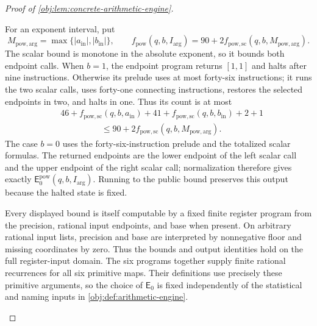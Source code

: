 \begin{proof}[Proof of \cref{obj:lem:concrete-arithmetic-engine}]
\begin{enumerate}
For an exponent interval, put
\[
M_{\mathrm{pow},\mathrm{arg}}
 =\max\{|a_{\mathrm{in}}|,|b_{\mathrm{in}}|\},
\qquad
f_{\mathrm{pow}}(q,b,I_{\mathrm{arg}})
 =90+2f_{\mathrm{pow},\mathrm{sc}}
       (q,b,M_{\mathrm{pow},\mathrm{arg}}).
\]
The scalar bound is monotone in the absolute exponent, so it bounds both endpoint calls. When \(b=1\), the endpoint program returns \([1,1]\) and halts after nine instructions. Otherwise its prelude uses at most forty-six instructions; it runs the two scalar calls, uses forty-one connecting instructions, restores the selected endpoints in two, and halts in one. Thus its count is at most
\[
\begin{split}
&46+f_{\mathrm{pow},\mathrm{sc}}(q,b,a_{\mathrm{in}})
 +41+f_{\mathrm{pow},\mathrm{sc}}(q,b,b_{\mathrm{in}})+2+1\\
&\hspace{2cm}\le
90+2f_{\mathrm{pow},\mathrm{sc}}
       (q,b,M_{\mathrm{pow},\mathrm{arg}}).
\end{split}
\]
The case \(b=0\) uses the forty-six-instruction prelude and the totalized scalar formulas. The returned endpoints are the lower endpoint of the left scalar call and the upper endpoint of the right scalar call; normalization therefore gives exactly
\(\mathsf E_0^{\mathrm{pow}}(q,b,I_{\mathrm{arg}})\).
Running to the public bound preserves this output because the halted state is fixed.

Every displayed bound is itself computable by a fixed finite register program from the precision, rational input endpoints, and base when present. On arbitrary rational input lists, precision and base are interpreted by nonnegative floor and missing coordinates by zero. Thus the bounds and output identities hold on the full register-input domain. The six programs together supply finite rational recurrences for all six primitive maps. Their definitions use precisely these primitive arguments, so the choice of \(\mathsf E_0\) is fixed independently of the statistical and naming inputs in \cref{obj:def:arithmetic-engine}.


\end{enumerate}
\end{proof}
